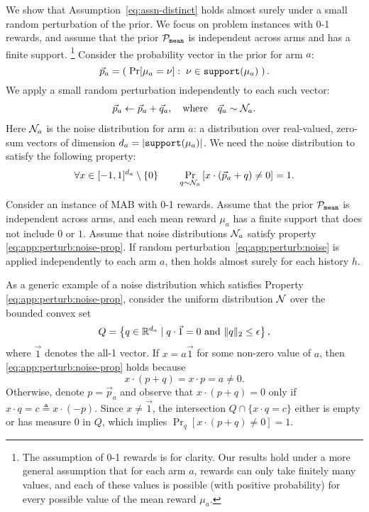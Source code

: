 We show that Assumption~\eqref{eq:assn-distinct} holds almost surely under a small random perturbation of the prior. We focus on problem instances with 0-1 rewards, and assume that the prior $\mathcal{P}_\mathtt{mean}$ is independent across arms and has a finite support.%
\footnote{The assumption of 0-1 rewards is for clarity. Our results hold under a more general assumption that for each arm $a$, rewards can only take finitely many values, and each of these values is possible (with positive probability) for every possible value of the mean reward $\mu_a$.}
 Consider the probability vector in the prior for arm $a$:
\[ \vec{p}_a = \left(\; \Pr[\mu_a=\nu]:\; \nu\in \mathtt{support}(\mu_a)\; \right).\]
We apply a small random perturbation independently to each such vector:
\begin{align}\label{eq:app:perturb:noise}
\vec{p}_a \leftarrow \vec{p}_a + \vec{q}_a,
    \quad \text{where}\quad \vec{q}_a\sim  \mathcal{N}_a.
\end{align}
Here $\mathcal{N}_a$ is the noise distribution for arm $a$: a distribution over real-valued, zero-sum vectors of dimension $d_a = |\mathtt{support}(\mu_a)|$. We need the noise distribution to satisfy the following property:
\begin{align}\label{eq:app:perturb:noise-prop}
\forall x\in [-1,1]^{d_a}\setminus \{0\}\qquad
\Pr_{q\sim \mathcal{N}_a}\left[ x\cdot(\vec{p}_a+ q) \neq 0 \right] =1.
\end{align}

\begin{theorem}\label{thm:perturb}
Consider an instance of MAB with 0-1 rewards. Assume that the prior $\mathcal{P}_\mathtt{mean}$ is independent across arms, and each mean reward $\mu_a$ has a finite support that does not include $0$ or $1$. Assume that noise distributions $\mathcal{N}_a$ satisfy property \eqref{eq:app:perturb:noise-prop}. If random perturbation~\eqref{eq:app:perturb:noise} is applied independently to each arm $a$, then  holds almost surely for each history $h$.
\end{theorem}

\begin{remark}
As a generic example of a noise distribution which satisfies
  Property \eqref{eq:app:perturb:noise-prop}, consider the uniform
  distribution $\mathcal{N}$ over the bounded convex set
  \[ Q = \left\{q \in \mathbb{R}^{d_a} \mid q \cdot \vec{1} = 0 \mbox{ and }
      \|q\|_2 \leq \epsilon\right\}, \] where $\vec{1}$ denotes the all-1
  vector. If $x = a \vec{1}$ for some non-zero value of $a$, then
  \eqref{eq:app:perturb:noise-prop} holds because
  $$x \cdot (p+q) = x \cdot p = a\neq 0.$$ Otherwise, denote
  $p=\vec{p}_a$ and observe that $x\cdot({p}+ {q}) = 0$ only if
  $x \cdot q = c \triangleq x \cdot (-p)$. Since $x\neq \vec{1}$, the
  intersection $Q\cap\{ x\cdot q = c \}$ either is empty or has
  measure 0 in $Q$, which implies
  $\Pr_{{q}}\left[ x\cdot({p}+ {q}) \neq 0 \right] =1$.
\end{remark}


